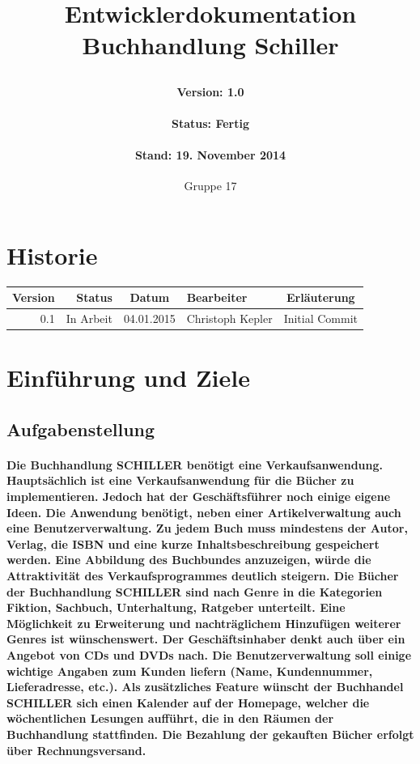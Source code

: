 \documentclass[a4paper]{article}
\author{Gruppe 17}
\date{}
\title{
	\normalfont
	\normalsize 
	\huge{Entwicklerdokumentation Buchhandlung Schiller}
	\horrule{0.5pt}
	\paragraph{Version: 1.0}
	\paragraph{Status: Fertig}
	\paragraph{Stand: 19. November 2014}
	\horrule{2pt}
}
\begin{document}
\maketitle

\newpage
 
\section*{Historie}

\begin{tabular}{|r|r|c|l|c|}
	\hline
	\rowcolor[HTML]{C0C0C0} 
	Version & Status    & Datum      & Bearbeiter       & Erläuterung    	\\ \hline
	0.1     & In Arbeit & 04.01.2015 & Christoph Kepler & Initial Commit 	\\ \hline
\end{tabular}

\newpage


\tableofcontents

\newpage

\section{Einführung und Ziele}

\subsection{Aufgabenstellung}

\paragraph{Die Buchhandlung SCHILLER benötigt eine Verkaufsanwendung. Hauptsächlich ist eine Verkaufsanwendung für die Bücher zu implementieren. Jedoch hat der Geschäftsführer noch einige eigene Ideen. 
Die Anwendung benötigt, neben einer Artikelverwaltung auch eine Benutzerverwaltung. Zu jedem Buch muss mindestens der Autor, Verlag, die ISBN und eine kurze Inhaltsbeschreibung gespeichert werden. Eine Abbildung des Buchbundes anzuzeigen, würde die Attraktivität des Verkaufsprogrammes deutlich steigern. Die Bücher der Buchhandlung SCHILLER sind nach Genre in die Kategorien Fiktion, Sachbuch, Unterhaltung, Ratgeber unterteilt. Eine Möglichkeit zu Erweiterung und nachträglichem Hinzufügen weiterer Genres ist wünschenswert. Der Geschäftsinhaber denkt auch über ein Angebot von CDs und DVDs nach. Die Benutzerverwaltung soll einige wichtige Angaben zum Kunden liefern (Name, Kundennummer, Lieferadresse, etc.). 
Als zusätzliches Feature wünscht der Buchhandel SCHILLER sich einen Kalender auf der Homepage, welcher die wöchentlichen Lesungen aufführt, die in den Räumen der Buchhandlung stattfinden. Die Bezahlung der gekauften Bücher erfolgt über Rechnungsversand.}
\end{document}
